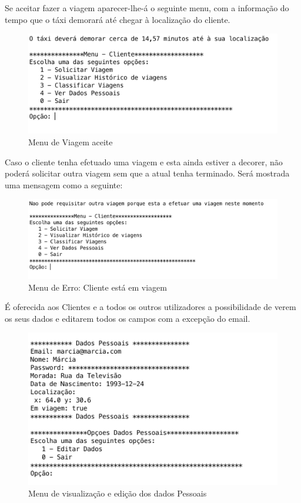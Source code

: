 Se aceitar fazer a viagem aparecer-lhe-á o seguinte menu, com a informação do tempo que o táxi demorará até chegar à localização do cliente. 

\begin{figure}[htpb]
	\centering
	\includegraphics[scale=0.6]{imagem/aceitarViagem}
	\caption{Menu de Viagem aceite }
	\label{p3:fig:p3_aceitarViagem}
\end{figure}

Caso o cliente tenha efetuado uma viagem e esta ainda estiver a decorer, não poderá solicitar outra viagem sem que a atual tenha terminado. Será mostrada uma mensagem como a seguinte: 
\begin{figure}[htpb]
	\centering
	\includegraphics[scale=0.6]{imagem/erroEmViagem}
	\caption{Menu de Erro: Cliente está em viagem }
	\label{p3:fig:p3_erroEmViagem}
\end{figure}

É oferecida aos Clientes e a todos os outros utilizadores a possibilidade de verem os seus dados e editarem todos os campos com a excepção do email. 
\begin{figure}[htpb]
	\centering
	\includegraphics[scale=0.6]{imagem/verDadosPessoais}
	\caption{Menu de visualização e edição dos dados Pessoais }
	\label{p3:fig:p3_verDadosPessoais}
\end{figure}

